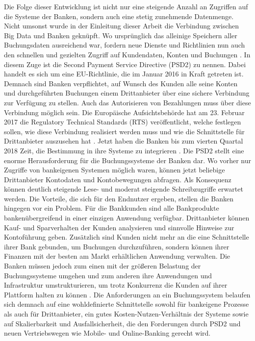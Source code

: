 \documentclass[12pt,oneside,a4paper,parskip]{scrbook}
\begin{document}
Die Folge dieser Entwicklung ist nicht nur eine steigende Anzahl an Zugriffen auf die Systeme der Banken, sondern auch eine stetig zunehmende Datenmenge. Nicht umsonst wurde in der Einleitung dieser Arbeit die Verbindung zwischen Big Data und Banken geknüpft. Wo ursprünglich das alleinige Speichern aller Buchungsdaten ausreichend war, fordern neue Dienste und Richtlinien nun auch den schnellen und gezielten Zugriff auf Kundendaten, Konten und Buchungen \cite{bigdataBigStorage}. In diesem Zuge ist die Second Payment Service Directive (PSD2) zu nennen. Dabei handelt es sich um eine EU-Richtlinie, die im Januar 2016 in Kraft getreten ist. Demnach sind Banken verpflichtet, auf Wunsch des Kunden alle seine Konten und durchgeführten Buchungen einem Drittanbieter über eine sichere Verbindung zur Verfügung zu stellen. Auch das Autorisieren von Bezahlungen muss über diese Verbindung möglich sein. Die Europäische Aufsichtsbehörde hat am 23. Februar 2017 die Regulatory Technical Standards (RTS) veröffentlicht, welche festlegen sollen, wie diese Verbindung realisiert werden muss und wie die Schnittstelle für Drittanbieter auszusehen hat \cite{rts}. Jetzt haben die Banken bis zum vierten Quartal 2018 Zeit, die Bestimmung in ihre Systeme zu integrieren \cite{eu-psd2}\cite{psd2dk}. Die PSD2 stellt eine enorme Herausforderung für die Buchungssysteme der Banken dar. Wo vorher nur Zugriffe von bankeigenen Systemen möglich waren, können jetzt beliebige Drittanbieter Kontodaten und Kontobewegungen abfragen. Als Konsequenz können deutlich steigende Lese- und moderat steigende Schreibzugriffe erwartet werden. Die Vorteile, die sich für den Endnutzer ergeben, stellen die Banken hingegen vor ein Problem. Für die Bankkunden sind alle Bankprodukte bankenübergreifend in einer einzigen Anwendung verfügbar. Drittanbieter können Kauf- und Sparverhalten der Kunden analysieren und sinnvolle Hinweise zur Kontoführung geben. Zusätzlich sind Kunden nicht mehr an die eine Schnittstelle ihrer Bank gebunden, um Buchungen durchzuführen, sondern können ihrer Finanzen mit der besten am Markt erhältlichen Anwendung verwalten. Die Banken müssen jedoch zum einen mit der größeren Belastung der Buchungssysteme umgehen und zum anderen ihre Anwendungen und Infrastruktur umstrukturieren, um trotz Konkurrenz die Kunden auf ihrer Plattform halten zu können \cite{psd2vid}.
Die Anforderungen an ein Buchungssystem belaufen sich demnach auf eine wohldefinierte Schnittstelle sowohl für bankeigene Prozesse als auch für Drittanbieter, ein gutes Kosten-Nutzen-Verhältnis der Systeme sowie auf Skalierbarkeit und Ausfallsicherheit, die den Forderungen durch PSD2 und neuen Vertriebswegen wie Mobile- und Online-Banking gerecht wird.
\end{document}
